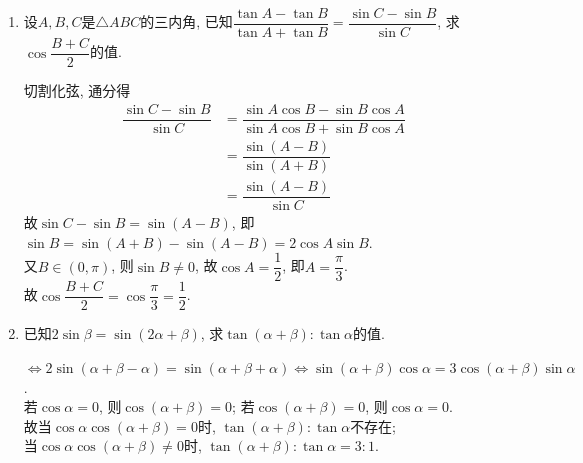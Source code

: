 \begin{enumerate}
\item 设$A,B,C$是$\triangle{ABC}$的三内角, 已知$\dfrac{\tan{A}-\tan{B}}{\tan{A}+\tan{B}}=\dfrac{\sin{C}-\sin{B}}{\sin{C}}$, 
求$\cos\dfrac{B+C}{2}$的值. 
\begin{jieda}
切割化弦, 通分得
\begin{align*}
\dfrac{\sin{C}-\sin{B}}{\sin{C}}
& =\dfrac{\sin{A}\cos{B}-\sin{B}\cos{A}}{\sin{A}\cos{B}+\sin{B}\cos{A}}\\
& =\dfrac{\sin\left(A-B\right)}{\sin\left(A+B\right)}\\
& =\dfrac{\sin\left(A-B\right)}{\sin{C}}
\end{align*}
故$\sin{C}-\sin{B}=\sin\left(A-B\right)$, 即$\sin{B}=\sin\left(A+B\right)-\sin\left(A-B\right)=2\cos{A}\sin{B}$. \\
又$B\in\left(0,\pi\right)$, 则$\sin{B}\neq 0$, 故$\cos{A}=\dfrac{1}{2}$, 即$A=\dfrac{\pi}{3}$. \\
故$\cos\dfrac{B+C}{2}=\cos\dfrac{\pi}{3}=\dfrac{1}{2}$. 
\end{jieda}
\item 已知$2\sin\beta=\sin\left(2\alpha+\beta\right)$, 求$\tan\left(\alpha+\beta\right):\tan\alpha$的值. 
\begin{jieda}
$\iff 2\sin\left(\alpha+\beta-\alpha\right)=\sin\left(\alpha+\beta+\alpha\right)\iff\sin\left(\alpha+\beta\right)\cos\alpha=3\cos\left(\alpha+\beta\right)\sin\alpha$. \\
若$\cos\alpha=0$, 则$\cos\left(\alpha+\beta\right)=0$; 若$\cos\left(\alpha+\beta\right)=0$, 则$\cos\alpha=0$. \\
故当$\cos\alpha\cos\left(\alpha+\beta\right)=0$时, $\tan\left(\alpha+\beta\right):\tan\alpha$不存在; \\
当$\cos\alpha\cos\left(\alpha+\beta\right)\neq 0$时, $\tan\left(\alpha+\beta\right):\tan\alpha=3:1$. 
\end{jieda}


\end{enumerate}
